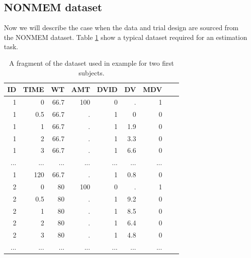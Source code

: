\subsection{NONMEM dataset}
\label{sec:eg3-NONMEMdataset}
Now we will describe the case when the data and trial design are sourced from the 
NONMEM dataset. Table \ref{tab:example3_dataSet} show a typical dataset required for 
an estimation task.
\begin{table}[htdp]
\begin{center}
\small
\renewcommand{\arraystretch}{1.1}%
\begin{tabular}{rrrrrrrrr}\toprule
ID	& TIME	& WT	& AMT	& DVID	& DV		& MDV  \\\midrule
1	& 0		& 66.7	& 100	& 0		& .		& 1  \\
1	& 0.5	& 66.7	& .		& 1		& 0		& 0  \\
1	& 1		& 66.7	& .		& 1		& 1.9	& 0  \\
1	& 2		& 66.7	& .		& 1		& 3.3	& 0  \\
1	& 3		& 66.7	& .		& 1		& 6.6	& 0  \\
...	& ...		& ...		&...		& ...		& ...		& ... \\
1	& 120	& 66.7	& .		& 1		& 0.8	& 0  \\
2	& 0		& 80 	& 100	& 0		& .		& 1 \\
2	& 0.5	& 80 	& .		& 1		& 9.2	& 0 \\
2	& 1		& 80		& .		& 1		& 8.5	& 0 \\
2	& 2		& 80		& .		& 1		& 6.4	& 0 \\
2	& 3		& 80		& .		& 1		& 4.8	& 0 \\
...	& ...		& ...		& ...		& ...		& ...		& ... \\ \bottomrule
\end{tabular}
\end{center}
\caption{A fragment of the dataset used in example \theexamples\; for two first subjects.}
\label{tab:example3_dataSet}
\end{table}%

